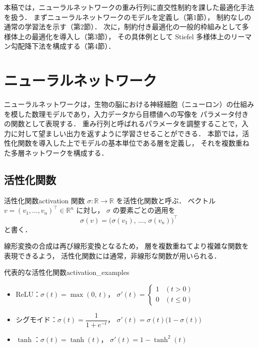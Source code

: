 \documentclass[uplatex, dvipdfmx]{jsarticle}
\begin{document}
\tableofcontents
\newpage

本稿では，ニューラルネットワークの重み行列に直交性制約を課した最適化手法を扱う．
まずニューラルネットワークのモデルを定義し（第1節），
制約なしの通常の学習法を示す（第2節）．
次に，制約付き最適化の一般的枠組みとして多様体上の最適化を導入し（第3節），
その具体例として Stiefel 多様体上のリーマン勾配降下法を構成する（第4節）．

\section{ニューラルネットワーク}

ニューラルネットワークは，生物の脳における神経細胞（ニューロン）の仕組みを模した数理モデルであり，入力データから目標値への写像を
パラメータ付きの関数として表現する．
重み行列と呼ばれるパラメータを調整することで，入力に対して望ましい出力を返すように学習させることができる．
本節では，活性化関数を導入した上でモデルの基本単位である層を定義し，
それを複数重ねた多層ネットワークを構成する．

\subsection{活性化関数}

\begin{definition}{活性化関数}{activation}
関数 $\sigma\colon\mathbb{R}\to\mathbb{R}$ を活性化関数と呼ぶ．
ベクトル $v=(v_1,\ldots,v_n)^\top\in\mathbb{R}^n$ に対し，
$\sigma$ の要素ごとの適用を
\[
\sigma(v) = \bigl(\sigma(v_1),\,\ldots,\,\sigma(v_n)\bigr)^\top
\]
と書く．
\end{definition}

線形変換の合成は再び線形変換となるため，
層を複数重ねてより複雑な関数を表現できるよう，
活性化関数には通常，非線形な関数が用いられる．

\begin{example}{代表的な活性化関数}{activation_examples}
\leavevmode
\begin{itemize}
  \setlength{\itemsep}{6pt}
  \item ReLU：$\sigma(t) = \max(0,\, t)$，\quad
    $\sigma'(t) = \begin{cases}1 & (t>0)\\0 & (t\le 0)\end{cases}$
  \item シグモイド：$\sigma(t) = \dfrac{1}{1+e^{-t}}$，\quad
    $\sigma'(t) = \sigma(t)\bigl(1-\sigma(t)\bigr)$
  \item $\tanh$：$\sigma(t) = \tanh(t)$，\quad
    $\sigma'(t) = 1-\tanh^2(t)$
\end{itemize}
\end{example}
\end{document}
